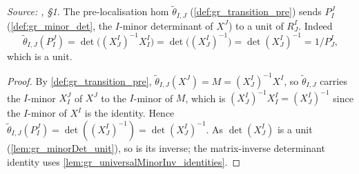 \begin{lemma}\leanok
  \label{lem:gr_transition_pre_unit}
  \textit{Source: \cite{nitsure-hilbert-quot}, \S 1.}
  The pre-localisation hom \(\tilde\theta_{I,J}\) (\cref{def:gr_transition_pre})
  sends \(P^J_I\) (\cref{def:gr_minor_det}, the \(I\)-minor determinant of
  \(X^J\)) to a unit of \(R^I_J\). Indeed
  \[
    \tilde\theta_{I,J}(P^J_I) = \det\bigl((X^I_J)^{-1} X^I_I\bigr)
      = \det\bigl((X^I_J)^{-1}\bigr) = \det(X^I_J)^{-1} = 1/P^I_J,
  \]
  which is a unit.
\end{lemma}
\begin{proof}
  \leanok
  By \cref{def:gr_transition_pre}, \(\tilde\theta_{I,J}(X^J) = M = (X^I_J)^{-1}
  X^I\), so \(\tilde\theta_{I,J}\) carries the \(I\)-minor \(X^J_I\) of \(X^J\) to
  the \(I\)-minor of \(M\), which is \((X^I_J)^{-1} X^I_I = (X^I_J)^{-1}\) since
  the \(I\)-minor of \(X^I\) is the identity. Hence \(\tilde\theta_{I,J}(P^J_I) =
  \det((X^I_J)^{-1}) = \det(X^I_J)^{-1}\). As \(\det(X^I_J)\) is a unit
  (\cref{lem:gr_minorDet_unit}), so is its inverse; the matrix-inverse
  determinant identity uses \cref{lem:gr_universalMinorInv_identities}.
\end{proof}


